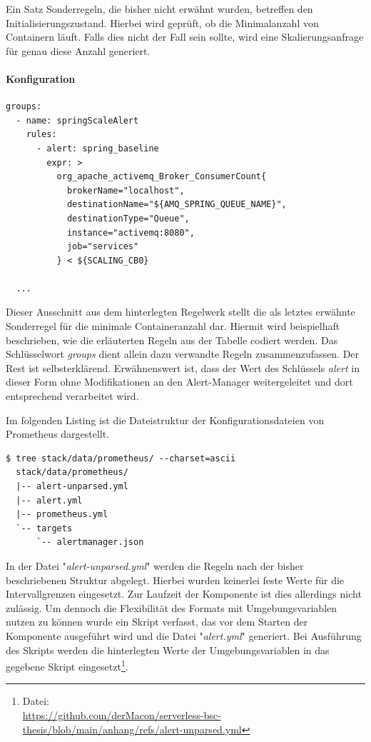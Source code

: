 Ein Satz Sonderregeln, die bisher nicht erwähnt wurden, betreffen den Initialisierungszustand. Hierbei wird geprüft, ob die Minimalanzahl von Containern läuft. Falls dies nicht der Fall sein sollte, wird eine Skalierungsanfrage für genau diese Anzahl generiert.


\paragraph{Konfiguration}

\begin{lstlisting}[style=bashStyle,caption={Umgebungsvariablen - Prometheus Regelsatz},label=lst:envMatrix]
  groups:
  - name: springScaleAlert
    rules:
      - alert: spring_baseline
        expr: >
          org_apache_activemq_Broker_ConsumerCount{
            brokerName="localhost",
            destinationName="${AMQ_SPRING_QUEUE_NAME}", 
            destinationType="Queue",
            instance="activemq:8080", 
            job="services"
          } < ${SCALING_CB0} 

  ...

\end{lstlisting}

Dieser Ausschnitt aus dem hinterlegten Regelwerk stellt die als letztes erwähnte Sonderregel für die minimale Containeranzahl dar. Hiermit wird beispielhaft beschrieben, wie die erläuterten Regeln aus der Tabelle codiert werden. Das Schlüsselwort \emph{groups} dient allein dazu verwandte Regeln zusammenzufassen. Der Rest ist selbsterklärend. Erwähnenswert ist, dass der Wert des Schlüssels \emph{alert} in dieser Form ohne Modifikationen an den Alert-Manager weitergeleitet und dort entsprechend verarbeitet wird.

\newpage 

Im folgenden Listing ist die Dateistruktur der Konfigurationsdateien von Prometheus dargestellt.

\begin{lstlisting}[style=bashStyle,caption={Prometheus -- Konfigurationsstruktur},label=lst:envMatrix]
  $ tree stack/data/prometheus/ --charset=ascii
  stack/data/prometheus/
  |-- alert-unparsed.yml
  |-- alert.yml
  |-- prometheus.yml
  `-- targets
      `-- alertmanager.json
\end{lstlisting}

In der Datei "\emph{alert-unparsed.yml}" werden die Regeln nach der bisher beschriebenen Struktur abgelegt. Hierbei wurden keinerlei feste Werte für die Intervallgrenzen eingesetzt. Zur Laufzeit der Komponente ist dies allerdings nicht zulässig. Um dennoch die Flexibilität des Formats mit Umgebungsvariablen nutzen zu können wurde ein Skript verfasst, das vor dem Starten der Komponente ausgeführt wird und die Datei "\emph{alert.yml}" generiert. Bei Ausführung des Skripts werden die hinterlegten Werte der Umgebungsvariablen in das gegebene Skript eingesetzt\footnote{Datei:\\\url{https://github.com/derMacon/serverless-bsc-thesis/blob/main/anhang/refs/alert-unparsed.yml}}. 

